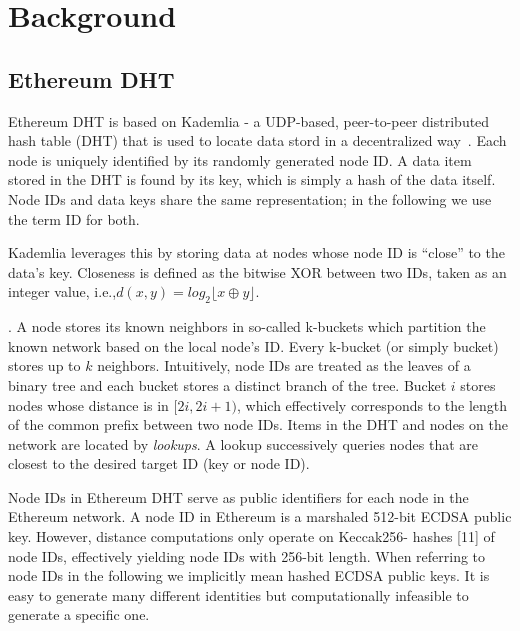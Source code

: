 
\section{Background}
\label{sec:background}


\subsection{Ethereum DHT}
Ethereum DHT is based on Kademlia - a UDP-based, peer-to-peer distributed hash table (DHT) that is used to locate data stord in a decentralized way~\cite{maymounkov2002kademlia}. Each node is uniquely identified by its randomly generated node ID. A data item stored in the DHT is found by its key, which is simply a hash of the data itself. Node IDs and data keys share the same representation; in the following we use the term ID for both.

Kademlia leverages this by storing data at nodes whose node ID is “close” to the data’s key. Closeness is defined as the bitwise XOR between two IDs, taken as an integer value, i.e.,$d(x, y) = \textit{log}_2 \lfloor x \oplus y \rfloor$.


. A node stores its known neighbors in so-called k-buckets which partition the known network based on the local node’s ID. Every k-bucket (or simply bucket) stores up to $k$ neighbors. Intuitively, node IDs are treated as the leaves of a binary tree and each bucket stores a distinct branch of the tree. Bucket $i$ stores nodes whose distance is in $[2i, 2i+1)$, which effectively corresponds to the length of the common prefix between two node IDs. Items in the DHT and nodes on the network are located by \emph{lookups}. A lookup successively queries nodes that are closest to the desired target ID (key or node ID).

Node IDs in Ethereum DHT serve as public identifiers for each node in the Ethereum network. A node ID in Ethereum is a marshaled 512-bit ECDSA public key. However, distance computations only operate on Keccak256- hashes [11] of node IDs, effectively yielding node IDs with 256-bit length. When referring to node IDs in the following we implicitly mean hashed ECDSA public keys. It is easy to generate many different identities but computationally infeasible to generate a specific one.